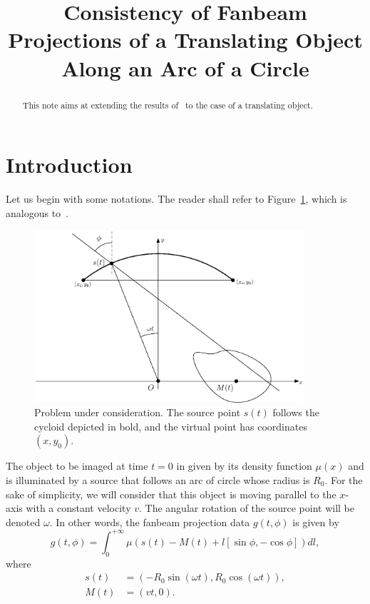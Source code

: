 \documentclass[a4paper]{article}
\title{Consistency of Fanbeam Projections of a Translating Object Along an Arc of a Circle}
\author{}
\date{}
\numberwithin{equation}{section}
\begin{document}
\maketitle

\begin{abstract}
This note aims at extending the results of~\cite{clackdoyle2015consistency} to the case of a translating object.
\end{abstract}

\section{Introduction}

Let us begin with some notations. The reader shall refer to Figure~\ref{fig:notations}, which is analogous to~\cite[Figure~2]{clackdoyle2015consistency}.
\begin{figure}[!ht]
	\centering
	\includegraphics[width=10cm]{frame_scanner.eps}
	\caption{Problem under consideration. The source point $s(t)$ follows the cycloid depicted in bold, and the virtual point has coordinates $(x,y_0)$.\label{fig:notations}}
\end{figure}
The object to be imaged at time $t=0$ in given by its density function $\mu(x)$ and is illuminated by a source that follows an arc of circle whose radius is $R_0$. For the sake of simplicity, we will consider that this object is moving parallel to the $x$-axis with a constant velocity $v$. The angular rotation of the source point will be denoted $\omega$. In other words, the fanbeam projection data $g(t,\phi)$ is given by
\begin{equation}
	g(t,\phi) = \int_0^{+\infty} \mu \left( s(t) - M(t) + l \left[ \sin \phi, -\cos \phi \right] \right) dl,
\end{equation}
where
\begin{align}
s(t) & = \left( -R_0 \sin(\omega t), R_0 \cos(\omega t) \right), \\
M(t) & =  \left( vt, 0 \right).
\end{align}
\end{document}
